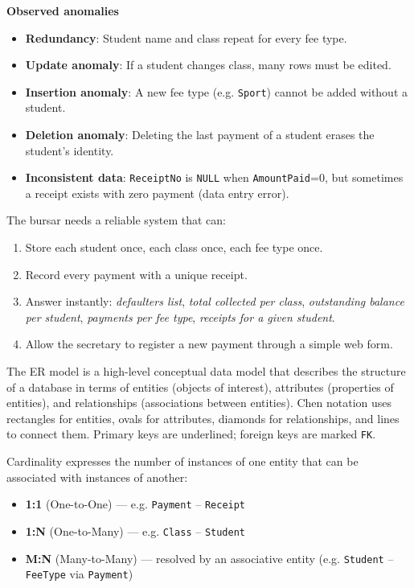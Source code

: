 \documentclass[11pt]{article}
\newcommand{\cle}[1]{{\popxbold\color{popdark}#1}}
\begin{document}
\begin{experience}
\textbf{Observed anomalies}
\begin{itemize}
    \item \textbf{Redundancy}: Student name and class repeat for every fee type.
    \item \textbf{Update anomaly}: If a student changes class, many rows must be edited.
    \item \textbf{Insertion anomaly}: A new fee type (e.g. \texttt{Sport}) cannot be added without a student.
    \item \textbf{Deletion anomaly}: Deleting the last payment of a student erases the student's identity.
    \item \textbf{Inconsistent data}: \texttt{ReceiptNo} is \texttt{NULL} when \texttt{AmountPaid}=0, but sometimes a receipt exists with zero payment (data entry error).
\end{itemize}

The bursar needs a reliable system that can:
\begin{enumerate}
    \item Store each student once, each class once, each fee type once.
    \item Record every payment with a unique receipt.
    \item Answer instantly: \emph{defaulters list}, \emph{total collected per class}, \emph{outstanding balance per student}, \emph{payments per fee type}, \emph{receipts for a given student}.
    \item Allow the secretary to register a new payment through a simple web form.
\end{enumerate}
\end{experience}

\begin{definition}
The ER model is a high-level conceptual data model that describes the structure of a database in terms of \cle{entities} (objects of interest), \cle{attributes} (properties of entities), and \cle{relationships} (associations between entities). Chen notation uses rectangles for entities, ovals for attributes, diamonds for relationships, and lines to connect them. Primary keys are underlined; foreign keys are marked \texttt{FK}.
\end{definition}

\begin{propriete}
Cardinality expresses the number of instances of one entity that can be associated with instances of another:
\begin{itemize}
    \item \textbf{1:1} (One-to-One) --- e.g. \texttt{Payment} -- \texttt{Receipt}
    \item \textbf{1:N} (One-to-Many) --- e.g. \texttt{Class} -- \texttt{Student}
    \item \textbf{M:N} (Many-to-Many) --- resolved by an associative entity (e.g. \texttt{Student} -- \texttt{FeeType} via \texttt{Payment})
\end{itemize}
\end{propriete}
\end{document}
